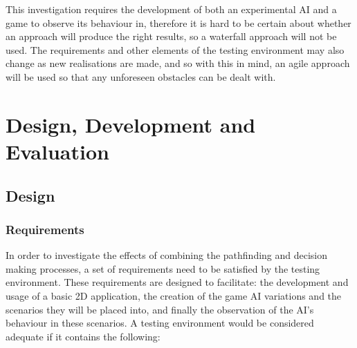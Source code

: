 \documentclass[11pt, a4paper]{report}
\begin{document}
This investigation requires the development of both an experimental AI and a game to observe its behaviour in, therefore it is hard to be certain about whether an approach will produce the right results, so a waterfall approach will not be used. The requirements and other elements of the testing environment may also change as new realisations are made, and so with this in mind, an agile approach will be used so that any unforeseen obstacles can be dealt with.

\chapter{Design, Development and Evaluation}
\label{chapter:designDevelopmentAndEvaluation}

\section{Design}
\label{sec:design}

\subsection{Requirements}
\label{subsec:requirements}

In order to investigate the effects of combining the pathfinding and decision making processes, a set of requirements need to be satisfied by the testing environment. These requirements are designed to facilitate: the development and usage of a basic 2D application, the creation of the game AI variations and the scenarios they will be placed into, and finally the observation of the AI's behaviour in these scenarios. A testing environment would be considered adequate if it contains the following:
\end{document}
